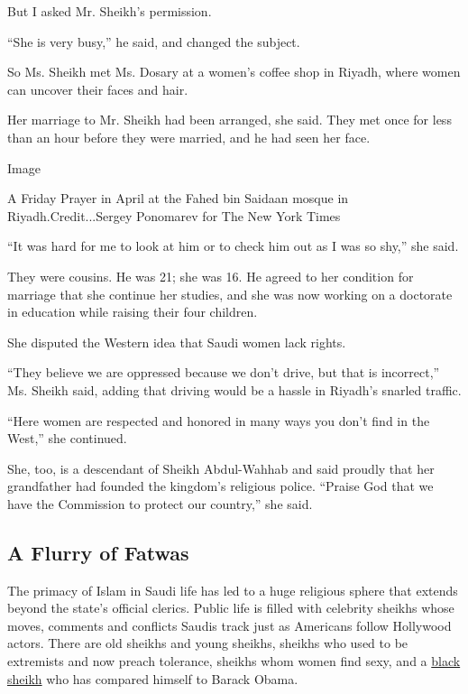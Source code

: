 But I asked Mr. Sheikh's permission.

``She is very busy,'' he said, and changed the subject.

So Ms. Sheikh met Ms. Dosary at a women's coffee shop in Riyadh, where
women can uncover their faces and hair.

Her marriage to Mr. Sheikh had been arranged, she said. They met once
for less than an hour before they were married, and he had seen her
face.

Image

A Friday Prayer in April at the Fahed bin Saidaan mosque in
Riyadh.Credit...Sergey Ponomarev for The New York Times

``It was hard for me to look at him or to check him out as I was so
shy,'' she said.

They were cousins. He was 21; she was 16. He agreed to her condition for
marriage that she continue her studies, and she was now working on a
doctorate in education while raising their four children.

She disputed the Western idea that Saudi women lack rights.

``They believe we are oppressed because we don't drive, but that is
incorrect,'' Ms. Sheikh said, adding that driving would be a hassle in
Riyadh's snarled traffic.

``Here women are respected and honored in many ways you don't find in
the West,'' she continued.

She, too, is a descendant of Sheikh Abdul-Wahhab and said proudly that
her grandfather had founded the kingdom's religious police. ``Praise God
that we have the Commission to protect our country,'' she said.

\hypertarget{a-flurry-of-fatwas}{%
\subsection{A Flurry of Fatwas}\label{a-flurry-of-fatwas}}

The primacy of Islam in Saudi life has led to a huge religious sphere
that extends beyond the state's official clerics. Public life is filled
with celebrity sheikhs whose moves, comments and conflicts Saudis track
just as Americans follow Hollywood actors. There are old sheikhs and
young sheikhs, sheikhs who used to be extremists and now preach
tolerance, sheikhs whom women find sexy, and a
\href{http://www.nytimes3xbfgragh.onion/2009/04/11/world/middleeast/11saudi.html}{black
sheikh} who has compared himself to Barack Obama.

